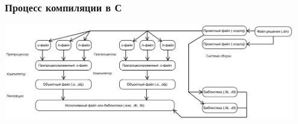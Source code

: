 \documentclass{../../slides-style}
\begin{document}
    \begin{frame}
        \frametitle{Процесс компиляции в С}
        \begin{center}
            \includegraphics[width=0.95\textwidth]{compilation.png}
        \end{center}
    \end{frame}
\end{document}
